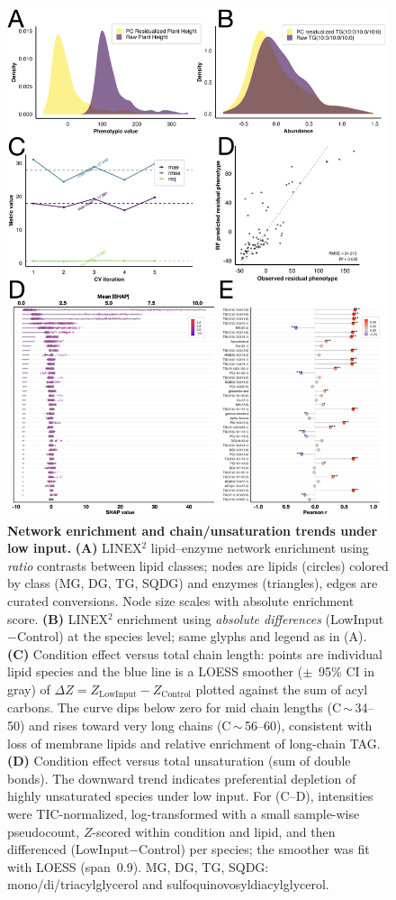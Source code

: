 \documentclass[10pt,letterpaper]{article}
\begin{document}
\begin{figure}[t]
  \centering
  \includegraphics[width=\textwidth]{fig/main/Fig4.png} %
  \caption{\textbf{Network enrichment and chain/unsaturation trends under low input.}
  \textbf{(A)} LINEX$^2$ lipid–enzyme network enrichment using \emph{ratio} contrasts between lipid classes; nodes are lipids (circles) colored by class (MG, DG, TG, SQDG) and enzymes (triangles), edges are curated conversions. Node size scales with absolute enrichment score.
  \textbf{(B)} LINEX$^2$ enrichment using \emph{absolute differences} (LowInput$-$Control) at the species level; same glyphs and legend as in (A).
  \textbf{(C)} Condition effect versus total chain length: points are individual lipid species and the blue line is a LOESS smoother ($\pm$~95\% CI in gray) of $\Delta Z = Z_{\mathrm{LowInput}} - Z_{\mathrm{Control}}$ plotted against the sum of acyl carbons. The curve dips below zero for mid chain lengths (C\,$\sim$\,34–50) and rises toward very long chains (C\,$\sim$\,56–60), consistent with loss of membrane lipids and relative enrichment of long-chain TAG. 
  \textbf{(D)} Condition effect versus total unsaturation (sum of double bonds). The downward trend indicates preferential depletion of highly unsaturated species under low input. 
  For (C–D), intensities were TIC-normalized, log-transformed with a small sample-wise pseudocount, $Z$-scored within condition and lipid, and then differenced (LowInput$-$Control) per species; the smoother was fit with LOESS (span~0.9). MG, DG, TG, SQDG: mono/di/triacylglycerol and sulfoquinovosyldiacylglycerol.}
  \label{fig:Fig4}
\end{figure}
\end{document}
